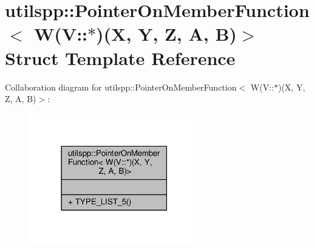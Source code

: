 \hypertarget{structutilspp_1_1PointerOnMemberFunction_3_01W_07V_1_1_5_08_07X_00_01Y_00_01Z_00_01A_00_01B_08_4}{\section{utilspp\-:\-:Pointer\-On\-Member\-Function$<$ W(V\-:\-:$\ast$)(X, Y, Z, A, B)$>$ Struct Template Reference}
\label{structutilspp_1_1PointerOnMemberFunction_3_01W_07V_1_1_5_08_07X_00_01Y_00_01Z_00_01A_00_01B_08_4}
}


Collaboration diagram for utilspp\-:\-:Pointer\-On\-Member\-Function$<$ W(V\-:\-:$\ast$)(X, Y, Z, A, B)$>$\-:
\nopagebreak
\begin{figure}[H]
\begin{center}
\leavevmode
\includegraphics[width=210pt]{structutilspp_1_1PointerOnMemberFunction_3_01W_07V_1_1_5_08_07X_00_01Y_00_01Z_00_01A_00_01B_08_4__coll__graph}
\end{center}
\end{figure}
